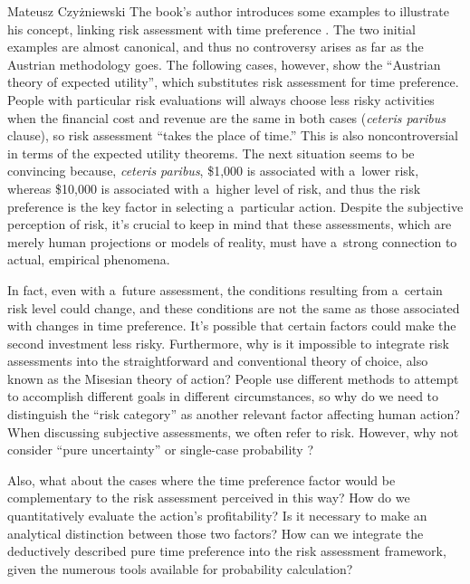 \begin{newrevengenv}{Mateusz Czyżniewski}
The book's author introduces some examples 
\parencite[][pp.79–81]{megger_sprawiedliwosc_2021} %
 to illustrate his concept, linking risk assessment with time preference 
\parencites[][pp.476–486]{mises_human_1998}[][pp.13–17, 49–56]{rothbard_man_2009}. %
 The two initial examples are almost canonical, and thus no controversy arises as far as the Austrian methodology goes. The following cases, however, show the ``Austrian theory of expected utility'', which substitutes risk assessment for time preference. People with particular risk evaluations will always choose less risky activities when the financial cost and revenue are the same in both cases (\textit{ceteris paribus} clause), so risk assessment ``takes the place of time.'' This is also noncontroversial in terms of the expected utility theorems. The next situation seems to be convincing because, \textit{ceteris paribus}, \$1,000 is associated with a~lower risk, whereas \$10,000 is associated with a~higher level of risk, and thus the risk preference is the key factor in selecting a~particular action. Despite the subjective perception of risk, it's crucial to keep in mind that these assessments, which are merely human projections or models of reality, must have a~strong connection to actual, empirical phenomena.



In fact, even with a~future assessment, the conditions resulting from a~certain risk level could change, and these conditions are not the same as those associated with changes in time preference. It's possible that certain factors could make the second investment less risky. Furthermore, why is it impossible to integrate risk assessments into the straightforward and conventional theory of choice, also known as the Misesian theory of action? People use different methods to attempt to accomplish different goals in different circumstances, so why do we need to distinguish the ``risk category'' as another relevant factor affecting human action? When discussing subjective assessments, we often refer to risk. However, why not consider ``pure uncertainty'' or single-case probability 
\parencite[][pp.105–118]{mises_human_1998}?%




Also, what about the cases where the time preference factor would be complementary to the risk assessment perceived in this way? How do we quantitatively evaluate the action's profitability? Is it necessary to make an analytical distinction between those two factors? How can we integrate the deductively described pure time preference into the risk assessment framework, given the numerous tools available for probability calculation?




\end{newrevengenv}
